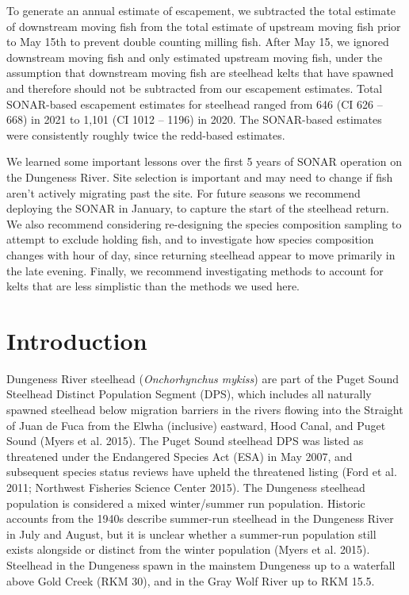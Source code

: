\documentclass[
]{article}
\begin{document}
To generate an annual estimate of escapement, we subtracted the total estimate of downstream moving fish from the total estimate of upstream moving fish prior to May 15th to prevent double counting milling fish. After May 15, we ignored downstream moving fish and only estimated upstream moving fish, under the assumption that downstream moving fish are steelhead kelts that have spawned and therefore should not be subtracted from our escapement estimates. Total SONAR-based escapement estimates for steelhead ranged from 646 (CI 626 -- 668) in 2021 to 1,101 (CI 1012 -- 1196) in 2020. The SONAR-based estimates were consistently roughly twice the redd-based estimates.

We learned some important lessons over the first 5 years of SONAR operation on the Dungeness River. Site selection is important and may need to change if fish aren't actively migrating past the site. For future seasons we recommend deploying the SONAR in January, to capture the start of the steelhead return. We also recommend considering re-designing the species composition sampling to attempt to exclude holding fish, and to investigate how species composition changes with hour of day, since returning steelhead appear to move primarily in the late evening. Finally, we recommend investigating methods to account for kelts that are less simplistic than the methods we used here.

\hypertarget{introduction}{%
\section{Introduction}\label{introduction}}

Dungeness River steelhead (\emph{Onchorhynchus mykiss}) are part of the Puget Sound Steelhead Distinct Population Segment (DPS), which includes all naturally spawned steelhead below migration barriers in the rivers flowing into the Straight of Juan de Fuca from the Elwha (inclusive) eastward, Hood Canal, and Puget Sound (Myers et al. 2015). The Puget Sound steelhead DPS was listed as threatened under the Endangered Species Act (ESA) in May 2007, and subsequent species status reviews have upheld the threatened listing (Ford et al. 2011; Northwest Fisheries Science Center 2015). The Dungeness steelhead population is considered a mixed winter/summer run population. Historic accounts from the 1940s describe summer-run steelhead in the Dungeness River in July and August, but it is unclear whether a summer-run population still exists alongside or distinct from the winter population (Myers et al. 2015). Steelhead in the Dungeness spawn in the mainstem Dungeness up to a waterfall above Gold Creek (RKM 30), and in the Gray Wolf River up to RKM 15.5.
\end{document}
